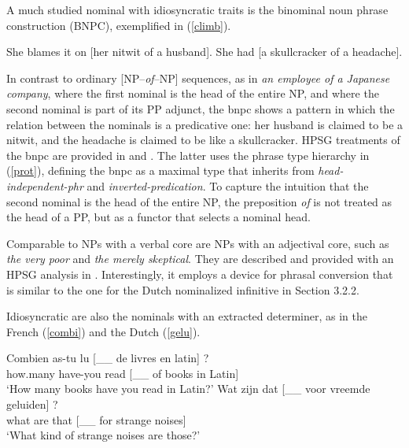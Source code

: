 \documentclass[output=paper]{langsci/langscibook}
\begin{document}
A much studied nominal with idiosyncratic traits is the binominal noun phrase 
construction (BNPC), exemplified in (\ref{climb}). 

\begin{exe}
\ex\label{climb}
\begin{xlist}
\ex  She blames it on [her nitwit of a husband]. 
\ex  She had [a skullcracker of a headache]. 
\end{xlist}
\end{exe}

\noindent
In contrast to ordinary [NP--{\it of\/}--NP] sequences, 
as in {\it an employee of a Japanese company}, where the 
first nominal is the head of the entire NP, and where the second 
nominal is part of its PP adjunct, the {\sc bnpc} shows a pattern
in which the relation between the nominals is a predicative one: 
her husband is claimed to be a nitwit, and the headache is claimed to be 
like a skullcracker. HPSG treatments of the {\sc bnpc} are provided in
\citet{KimSells14} and \citet{VanEynde18}. The latter uses 
the phrase type hierarchy in (\ref{prot}), defining the {\sc bnpc} as 
a maximal type that inherits from {\it head-independent-phr\/} and 
{\it inverted-predication}. To capture the intuition that the second
nominal is the head of the entire NP, the preposition {\it of\/} is 
not treated as the head of a PP, but as a functor that selects 
a nominal head. 

Comparable to NPs with a verbal core are NPs with an adjectival core,
such as {\it the very poor\/} and {\it the merely skeptical}. They are  
described and provided with an HPSG analysis in \citet{ArnoldSpencer2015}.
Interestingly, it employs a device for phrasal conversion that is similar to 
the one for the Dutch nominalized infinitive in Section 3.2.2. 

Idiosyncratic are also the nominals with an extracted determiner, as in 
the French (\ref{combi}) and the Dutch (\ref{gelu}). 

\begin{exe} 
\ex\label{combi}  
\gll   Combien as-tu lu [\_\_ de livres en latin] ?    \\
       how.many have-you read [\_\_ of books in Latin] \\ 
\trans `How many books have you read in Latin?' 
\ex\label{gelu}
\gll   Wat zijn dat [\_\_ voor vreemde geluiden] ? \\
       what are that [\_\_ for strange noises]     \\ 
\trans `What kind of strange noises are those?'  
\end{exe} 
\end{document}
